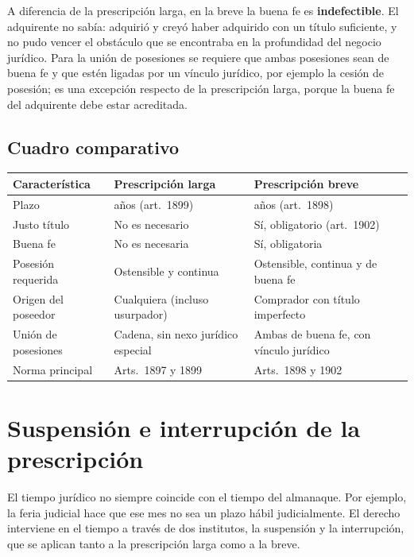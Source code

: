 \documentclass[12pt,oneside]{book}
\begin{document}
A diferencia de la prescripción larga, en la breve la buena fe es \textbf{indefectible}. El adquirente no sabía: adquirió y creyó haber adquirido con un título suficiente, y no pudo vencer el obstáculo que se encontraba en la profundidad del negocio jurídico. Para la unión de posesiones se requiere que ambas posesiones sean de buena fe y que estén ligadas por un vínculo jurídico, por ejemplo la cesión de posesión; es una excepción respecto de la prescripción larga, porque la buena fe del adquirente debe estar acreditada.

\subsection{Cuadro comparativo}

\begin{table}[H]
\centering
\begin{tabularx}{\textwidth}{@{}>{\raggedright\arraybackslash}p{}>{\raggedright\arraybackslash}X>{\raggedright\arraybackslash}X@{}}
\toprule
\textbf{Característica} & \textbf{Prescripción larga} & \textbf{Prescripción breve} \\
\midrule
Plazo & 20 años (art.~1899) & 10 años (art.~1898) \\
Justo título & No es necesario & Sí, obligatorio (art.~1902) \\
Buena fe & No es necesaria & Sí, obligatoria \\
Posesión requerida & Ostensible y continua & Ostensible, continua y de buena fe \\
Origen del poseedor & Cualquiera (incluso usurpador) & Comprador con título imperfecto \\
Unión de posesiones & Cadena, sin nexo jurídico especial & Ambas de buena fe, con vínculo jurídico \\
Norma principal & Arts.~1897 y 1899 & Arts.~1898 y 1902 \\
\bottomrule
\end{tabularx}
\end{table}

\section{Suspensión e interrupción de la prescripción}

El tiempo jurídico no siempre coincide con el tiempo del almanaque. Por ejemplo, la feria judicial hace que ese mes no sea un plazo hábil judicialmente. El derecho interviene en el tiempo a través de dos institutos, la suspensión y la interrupción, que se aplican tanto a la prescripción larga como a la breve.
\end{document}
